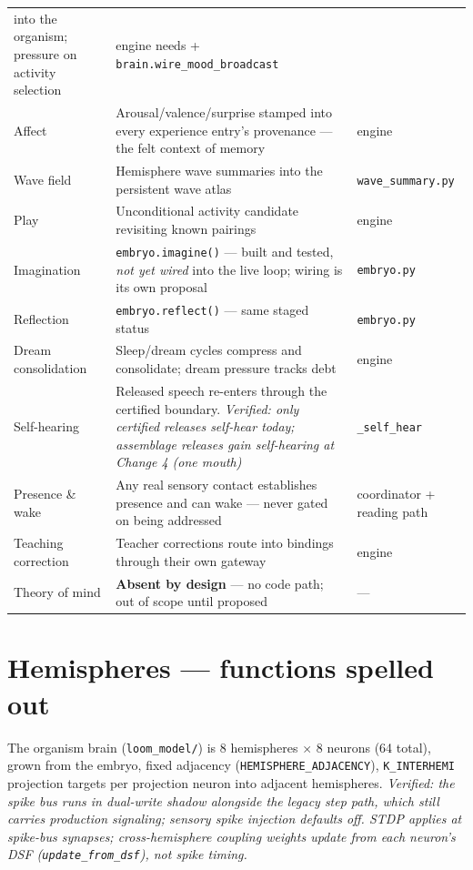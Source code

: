 \documentclass[11pt]{article}
\begin{document}
\begin{longtable}{p{} p{} p{}}
into the organism; pressure on activity selection & engine needs +
\texttt{brain.wire\_mood\_broadcast} \\
Affect & Arousal/valence/surprise stamped into every experience entry's
provenance — the felt context of memory & engine \\
Wave field & Hemisphere wave summaries into the persistent wave atlas &
\texttt{wave\_summary.py} \\
Play & Unconditional activity candidate revisiting known pairings &
engine \\
Imagination & \texttt{embryo.imagine()} — built and tested, \emph{not yet
wired} into the live loop; wiring is its own proposal &
\texttt{embryo.py} \\
Reflection & \texttt{embryo.reflect()} — same staged status &
\texttt{embryo.py} \\
Dream consolidation & Sleep/dream cycles compress and consolidate; dream
pressure tracks debt & engine \\
Self-hearing & Released speech re-enters through the certified boundary.
\emph{Verified: only certified releases self-hear today; assemblage
releases gain self-hearing at Change 4 (one mouth)} &
\texttt{\_self\_hear} \\
Presence \& wake & Any real sensory contact establishes presence and can
wake — never gated on being addressed & coordinator + reading path \\
Teaching correction & Teacher corrections route into bindings through
their own gateway & engine \\
Theory of mind & \textbf{Absent by design} — no code path; out of scope
until proposed & --- \\
\bottomrule
\end{longtable}

\section{Hemispheres — functions spelled out}\label{sec:hemis}

The organism brain (\texttt{loom\_model/}) is 8 hemispheres $\times$ 8
neurons (64 total), grown from the embryo, fixed adjacency
(\texttt{HEMISPHERE\_ADJACENCY}), \texttt{K\_INTERHEMI} projection targets
per projection neuron into adjacent hemispheres. \emph{Verified: the spike
bus runs in dual-write shadow alongside the legacy step path, which still
carries production signaling; sensory spike injection defaults off. STDP
applies at spike-bus synapses; cross-hemisphere coupling weights update
from each neuron's DSF (\texttt{update\_from\_dsf}), not spike timing.}
\end{document}
